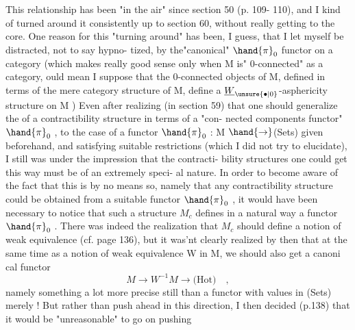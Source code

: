 
This relationship has been "in the air"  since section 50 (p. 109-%
110),  and I kind of turned around it consistently up to section 60,
without really getting to the core.  One reason for this "turning around"
has been,  I guess,  that I let myself be distracted,  not to say hypno-%
tized,  by the"canonical" $\hand{\pi}_0$ functor on a category (which makes really
good sense only when M is" 0-connected" as a category,  
ould mean  I suppose that the 0-connected objects of M,  defined in terms
of the mere category structure of M,  define a $\underline{W}_{\unsure{\bullet|0}}$-asphericity structure
on M )  Even after realizing (in section 59)  that one should generalize
the   of a contractibility structure in terms of  a "con-%
nected components functor" $\hand{\pi}_0$ ,  to the case of a functor $\hand{\pi}_0$ : M $\hand{\rightarrow}$(Sets)
given beforehand,  and satisfying suitable restrictions (which I did not
try to elucidate),  I still was under the impression that the contracti-%
bility structures one could get this  way must be of an extremely speci-%
al nature.  In order to become aware of the fact that this is by no means
so,  namely that any contractibility structure could be obtained from a
suitable functor $\hand{\pi}_0$ ,  it would have been necessary to notice that such
a structure $M_c$  defines in a natural way a functor $\hand{\pi}_0$ .  There was 
indeed the realization that $M_c$ should  define a notion of weak equivalence
(cf. page 136),  but it was'nt clearly realized by then that at the same
time as a notion of weak equivalence W in M,  we should also get a canoni%
cal functor
\[ M \longrightarrow W^{-1}M \longrightarrow \text{(Hot)} \quad , \]
namely something a lot more precise still than a functor with values in
(Sets)  merely !  But rather than push ahead in this direction, I then
decided (p.138)  that it would be "unreasonable"  to go on  pushing 
